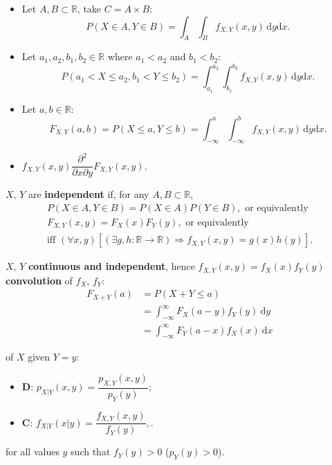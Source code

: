 \begin{itemize}
  \item Let \(A, B \subset \mathbb{R}\), take \(C = A \times B\):
    \[P(X \in A, Y \in B) = \int_A\int_B
    f_{X,Y}(x,y)\,\mathrm{d}y\mathrm{d}x.\]
  \item Let \(a_1, a_2, b_1, b_2 \in \mathbb{R}\) where \(a_1 < a_2\) and \(b_1
    < b_2\):
    \[P(a_1 < X \leq a_2, b_1 < Y \leq b_2) = \int_{a_1}^{a_2}\int_{b_1}^{b_2}
    f_{X, Y}(x,y)\,\mathrm{d}y\mathrm{d}x.\]
  \item Let \(a, b\in \mathbb{R}\):
    \[F_{X, Y}(a,b) = P(X \leq a, Y \leq b) = \int_{-\infty}^a\int_{-\infty}^b
      f_{X, Y}(x, y)\,\mathrm{d}y\mathrm{d}x.\]
  \item \(f_{X, Y}(x, y)\dfrac{\partial^2}{\partial x \partial y}F_{X, Y}(x,y).\)
\end{itemize}

 \(X\), \(Y\) are \textbf{independent} if,
for any \(A, B \subset \mathbb{R}\),
\begin{gather*}
  P(X \in A, Y \in B)=P(X \in A)P(Y \in B),\text{ or equivalently} \\
  F_{X,Y}(x,y)=F_X(x)F_Y(y), \text{ or equivalently} \\
  \text{iff }(\forall x, y) [(\exists g, h: \mathbb{R}\rightarrow \mathbb{R}) 
  \Rightarrow f_{X,Y}(x,y)=g(x)h(y)].
\end{gather*}

 \(X\), \(Y\) \textbf{continuous and
independent}, hence
\(f_{X,Y}(x,y) = f_X(x)f_Y(y)\) \tf \textbf{convolution} of \(f_X\), \(f_Y\):
\begin{align*}
F_{X+Y}(a) &= P(X + Y \leq a)\\
           &= \int_{-\infty}^{\infty}F_X(a-y)f_Y(y)\ \mathrm{d}y \\ 
           &= \int_{-\infty}^{\infty}F_Y(a-x)f_X(x)\ \mathrm{d}x
\end{align*}


 of \(X\) given \(Y = y\):
\begin{multicols}{2}
\begin{itemize}
  \item \textbf{D}: \(p_{X|Y}(x, y) = \dfrac{p_{X,Y}(x,y)}{p_Y(y)}\);
  \item \textbf{C}: \(f_{X|Y}(x|y) = \dfrac{f_{X,Y}(x,y)}{f_Y(y)},\).
\end{itemize} 
\end{multicols}
for all values \(y\) such that \(f_Y(y) > 0\) (\(p_Y(y) > 0\)).


